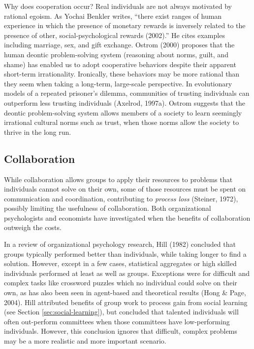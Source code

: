 Why does cooperation occur? Real individuals are not always motivated by rational egoism. As Yochai Benkler writes, ``there exist ranges of human experience in which the presence of monetary rewards is inversely related to the presence of other, social-psychological rewards (2002).'' He cites examples including marriage, sex, and gift exchange. Ostrom (2000) proposes that the human deontic problem-solving system (reasoning about norms, guilt, and shame) has enabled us to adopt cooperative behaviors despite their apparent short-term irrationality. Ironically, these behaviors may be more rational than they seem when taking a long-term, large-scale perspective. In evolutionary models of a repeated prisoner's dilemma, communities of trusting individuals can outperform less trusting individuals (Axelrod, 1997a). Ostrom suggests that the deontic problem-solving system allows members of a society to learn seemingly irrational cultural norms such as trust, when those norms allow the society to thrive in the long run.

\subsection{Collaboration}
While collaboration allows groups to apply their resources to problems that individuals
cannot solve on their own, some of those resources must be spent on communication and coordination, contributing to {\em process loss} (Steiner, 1972),
possibly limiting the usefulness of collaboration. Both organizational psychologists and economists have investigated when the benefits of collaboration outweigh the costs.

In a review of organizational psychology research, Hill (1982) concluded that groups typically performed better than individuals, while taking longer to find a solution. However, except in a few cases, statistical aggregates or high skilled individuals performed at least as well as groups. Exceptions were for difficult and complex tasks like crossword puzzles which no individual could solve on their own,
as has also been seen in agent-based and theoretical results (Hong \& Page, 2004).
Hill attributed benefits of group work to process gain from social learning (see Section \ref{sec:social-learning}),
but concluded that talented individuals will often out-perform committees when those committees have low-performing individuals.
However, this conclusion ignores that difficult, complex problems may be a more realistic and more important scenario.


